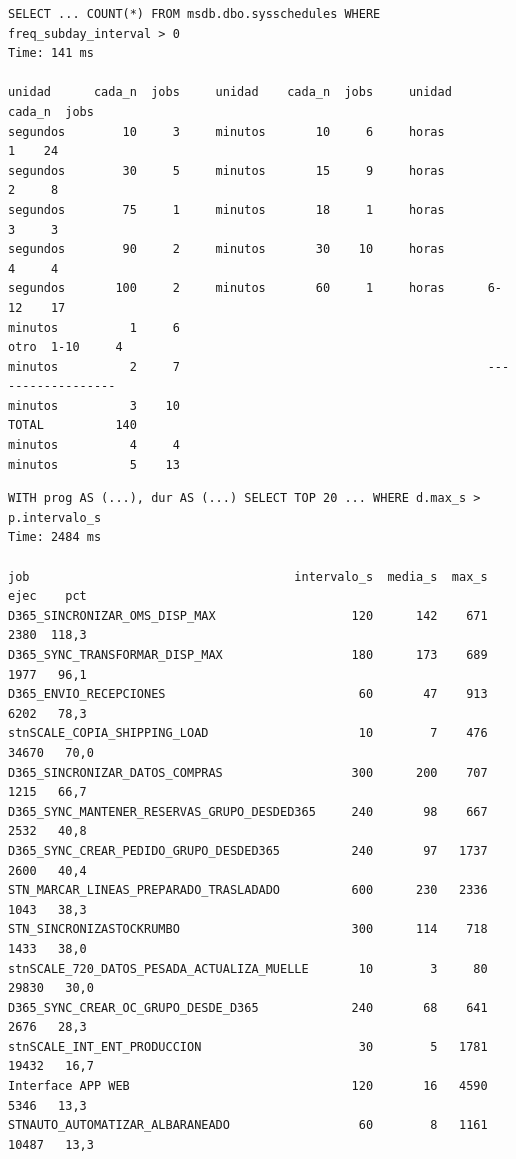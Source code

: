 \documentclass[11pt,a4paper]{article}
\begin{document}
\begin{lstlisting}[style=salida]
SELECT ... COUNT(*) FROM msdb.dbo.sysschedules WHERE freq_subday_interval > 0
Time: 141 ms

unidad      cada_n  jobs     unidad    cada_n  jobs     unidad   cada_n  jobs
segundos        10     3     minutos       10     6     horas         1    24
segundos        30     5     minutos       15     9     horas         2     8
segundos        75     1     minutos       18     1     horas         3     3
segundos        90     2     minutos       30    10     horas         4     4
segundos       100     2     minutos       60     1     horas      6-12    17
minutos          1     6                                           otro  1-10     4
minutos          2     7                                           ------------------
minutos          3    10                                           TOTAL          140
minutos          4     4
minutos          5    13
\end{lstlisting}

\begin{lstlisting}[style=salida]
WITH prog AS (...), dur AS (...) SELECT TOP 20 ... WHERE d.max_s > p.intervalo_s
Time: 2484 ms

job                                     intervalo_s  media_s  max_s  ejec    pct
D365_SINCRONIZAR_OMS_DISP_MAX                   120      142    671   2380  118,3
D365_SYNC_TRANSFORMAR_DISP_MAX                  180      173    689   1977   96,1
D365_ENVIO_RECEPCIONES                           60       47    913   6202   78,3
stnSCALE_COPIA_SHIPPING_LOAD                     10        7    476  34670   70,0
D365_SINCRONIZAR_DATOS_COMPRAS                  300      200    707   1215   66,7
D365_SYNC_MANTENER_RESERVAS_GRUPO_DESDED365     240       98    667   2532   40,8
D365_SYNC_CREAR_PEDIDO_GRUPO_DESDED365          240       97   1737   2600   40,4
STN_MARCAR_LINEAS_PREPARADO_TRASLADADO          600      230   2336   1043   38,3
STN_SINCRONIZASTOCKRUMBO                        300      114    718   1433   38,0
stnSCALE_720_DATOS_PESADA_ACTUALIZA_MUELLE       10        3     80  29830   30,0
D365_SYNC_CREAR_OC_GRUPO_DESDE_D365             240       68    641   2676   28,3
stnSCALE_INT_ENT_PRODUCCION                      30        5   1781  19432   16,7
Interface APP WEB                               120       16   4590   5346   13,3
STNAUTO_AUTOMATIZAR_ALBARANEADO                  60        8   1161  10487   13,3
\end{lstlisting}
\end{document}
